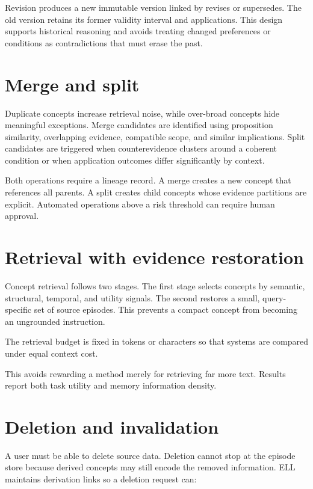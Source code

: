 \documentclass[
  english,
  a4paper,
  DIV=11,
  numbers=noendperiod]{scrreprt}
\begin{document}
Revision produces a new immutable version linked by revises or
supersedes. The old version retains its former validity interval and
applications. This design supports historical reasoning and avoids
treating changed preferences or conditions as contradictions that must
erase the past.

\section{Merge and split}\label{merge-and-split}

Duplicate concepts increase retrieval noise, while over-broad concepts
hide meaningful exceptions. Merge candidates are identified using
proposition similarity, overlapping evidence, compatible scope, and
similar implications. Split candidates are triggered when
counterevidence clusters around a coherent condition or when application
outcomes differ significantly by context.

Both operations require a lineage record. A merge creates a new concept
that references all parents. A split creates child concepts whose
evidence partitions are explicit. Automated operations above a risk
threshold can require human approval.

\section{Retrieval with evidence
restoration}\label{retrieval-with-evidence-restoration}

Concept retrieval follows two stages. The first stage selects concepts
by semantic, structural, temporal, and utility signals. The second
restores a small, query-specific set of source episodes. This prevents a
compact concept from becoming an ungrounded instruction.

The retrieval budget is fixed in tokens or characters so that systems
are compared under equal context cost.

This avoids rewarding a method merely for retrieving far more text.
Results report both task utility and memory information density.

\section{Deletion and invalidation}\label{deletion-and-invalidation}

A user must be able to delete source data. Deletion cannot stop at the
episode store because derived concepts may still encode the removed
information. ELL maintains derivation links so a deletion request can:
\end{document}
